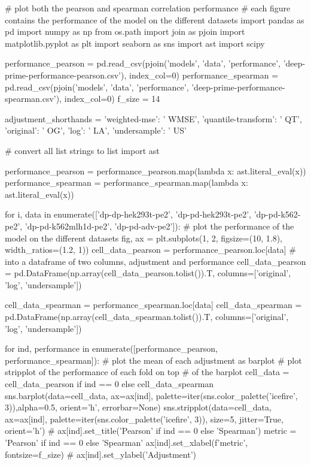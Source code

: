 # plot both the pearson and spearman correlation performance
# each figure contains the performance of the model on the different datasets
import pandas as pd
import numpy as np
from os.path import join as pjoin
import matplotlib.pyplot as plt
import seaborn as sns
import ast
import scipy

performance_pearson = pd.read_csv(pjoin('models', 'data', 'performance', 'deep-prime-performance-pearson.csv'), index_col=0)
performance_spearman = pd.read_csv(pjoin('models', 'data', 'performance', 'deep-prime-performance-spearman.csv'), index_col=0)
f_size = 14

adjustment_shorthands = {
    'weighted-mse': '   WMSE',
    'quantile-transform': '     QT',
    'original': '     OG',
    'log': '     LA',
    'undersample': '     US'
}

# convert all list strings to list
import ast

performance_pearson = performance_pearson.map(lambda x: ast.literal_eval(x))
performance_spearman = performance_spearman.map(lambda x: ast.literal_eval(x))

for i, data in enumerate(['dp-dp-hek293t-pe2', 'dp-pd-hek293t-pe2', 'dp-pd-k562-pe2', 'dp-pd-k562mlh1d-pe2', 'dp-pd-adv-pe2']):
    # plot the performance of the model on the different datasets
    fig, ax = plt.subplots(1, 2, figsize=(10, 1.8), width_ratios=(1.2, 1))
    cell_data_pearson = performance_pearson.loc[data]
    # into a dataframe of two columns, adjustment and performance
    cell_data_pearson = pd.DataFrame(np.array(cell_data_pearson.tolist()).T, columns=['original', 'log', 'undersample'])
    
    cell_data_spearman = performance_spearman.loc[data]
    cell_data_spearman = pd.DataFrame(np.array(cell_data_spearman.tolist()).T, columns=['original', 'log', 'undersample'])
    
    for ind, performance in enumerate([performance_pearson, performance_spearman]):
        # plot the mean of each adjustment as barplot
        # plot stripplot of the performance of each fold on top
        # of the barplot
        cell_data = cell_data_pearson if ind == 0 else cell_data_spearman
        sns.barplot(data=cell_data, ax=ax[ind], palette=iter(sns.color_palette('icefire', 3)),alpha=0.5, orient='h', errorbar=None)
        sns.stripplot(data=cell_data, ax=ax[ind], palette=iter(sns.color_palette('icefire', 3)), size=5, jitter=True, orient='h')
        # ax[ind].set_title('Pearson' if ind == 0 else 'Spearman')
        metric = 'Pearson' if ind == 0 else 'Spearman'
        ax[ind].set_xlabel(f'{metric}', fontsize=f_size)
        # ax[ind].set_ylabel('Adjustment')
        
